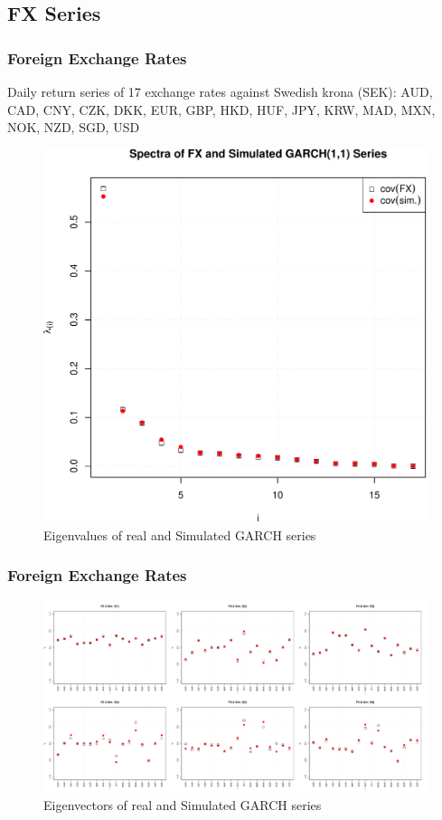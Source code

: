 \documentclass{beamer}
\begin{document}
\subsection{FX Series}
\begin{frame}
  \frametitle{Foreign Exchange Rates}
  Daily return series of 17 exchange rates against Swedish krona (SEK):
  AUD,
  CAD,
  CNY,
  CZK,
  DKK,
  EUR,
  GBP,
  HKD,
  HUF,
  JPY,
  KRW,
  MAD,
  MXN,
  NOK,
  NZD,
  SGD,
  USD
  \begin{figure}[htb!]
    \centering
    \includegraphics[scale=0.35]{FX_eigenvalues.pdf}
    \caption{\scriptsize Eigenvalues of real and Simulated GARCH series}
  \end{figure}
\end{frame}

\begin{frame}
  \frametitle{Foreign Exchange Rates}
  \begin{figure}[htb!]
    \centering
    \includegraphics[scale=0.2]{FX_eigenvectors.pdf}
    \caption{\scriptsize Eigenvectors of real and Simulated GARCH series}
  \end{figure}
\end{frame}
\end{document}

